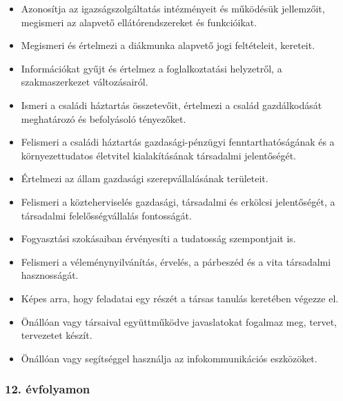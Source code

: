\begin{itemize}
\item
  Azonosítja az igazságszolgáltatás intézményeit és működésük
  jellemzőit, megismeri az alapvető ellátórendszereket és funkcióikat.
\item
  Megismeri és értelmezi a diákmunka alapvető jogi feltételeit,
  kereteit.
\item
  Információkat gyűjt és értelmez a foglalkoztatási helyzetről, a
  szakmaszerkezet változásairól.
\item
  Ismeri a családi háztartás összetevőit, értelmezi a család
  gazdálkodását meghatározó és befolyásoló tényezőket.
\item
  Felismeri a családi háztartás gazdasági-pénzügyi fenntarthatóságának
  és a környezettudatos életvitel kialakításának társadalmi
  jelentőségét.
\item
  Értelmezi az állam gazdasági szerepvállalásának területeit.
\item
  Felismeri a közteherviselés gazdasági, társadalmi és erkölcsi
  jelentőségét, a társadalmi felelősségvállalás fontosságát.
\item
  Fogyasztási szokásaiban érvényesíti a tudatosság szempontjait is.
\item
  Felismeri a véleménynyilvánítás, érvelés, a párbeszéd és a vita
  társadalmi hasznosságát.
\item
  Képes arra, hogy feladatai egy részét a társas tanulás keretében
  végezze el.
\item
  Önállóan vagy társaival együttműködve javaslatokat fogalmaz meg,
  tervet, tervezetet készít.
\item
  Önállóan vagy segítséggel használja az infokommunikációs eszközöket.
\end{itemize}

\hypertarget{evfolyamon-1}{%
\subsubsection{12. évfolyamon}\label{evfolyamon-1}}

